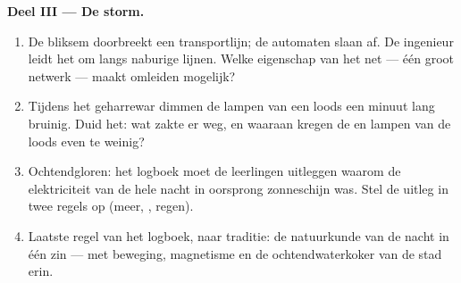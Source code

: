 \begin{problem}
\medskip\noindent\textbf{Deel III --- De storm.}
\begin{enumerate}[resume]
  \item De bliksem doorbreekt een transportlijn; de automaten slaan
        af. De ingenieur leidt het  om langs naburige
        lijnen. Welke eigenschap van het net --- één groot 
        netwerk --- maakt omleiden mogelijk?
  \item Tijdens het geharrewar dimmen de lampen van een loods
        een minuut lang bruinig. Duid het: wat zakte er weg, en waaraan
        kregen de  en lampen van de loods even te weinig?
  \item Ochtendgloren: het logboek moet de leerlingen uitleggen waarom
        de elektriciteit van de hele nacht in oorsprong zonneschijn
        was. Stel de uitleg in twee regels op (meer, ,
        regen).
  \item Laatste regel van het logboek, naar traditie: de natuurkunde
        van de nacht in één zin --- met beweging, magnetisme en de
        ochtendwaterkoker van de stad erin.
\end{enumerate}
\end{problem}
